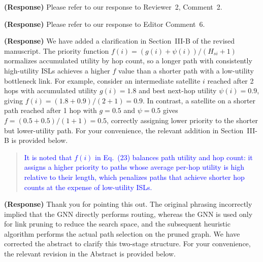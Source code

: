 \documentclass[letter]{article}
\begin{document}
\vspace{5mm}
{\bf (Response)}
Please refer to our response to Reviewer~2, Comment~2.

\vspace{10mm}
\noindent {}

\vspace{5mm}
{\bf (Response)}
Please refer to our response to Editor Comment~6.

\vspace{10mm}
\noindent {}

\vspace{5mm}
{\bf (Response)}
We have added a clarification in Section~III-B of the revised manuscript. The priority function $f(i) = (g(i) + \psi(i)) / (H_{si} + 1)$ normalizes accumulated utility by hop count, so a longer path with consistently high-utility ISLs achieves a higher $f$ value than a shorter path with a low-utility bottleneck link. For example, consider an intermediate satellite $i$ reached after 2 hops with accumulated utility $g(i) = 1.8$ and best next-hop utility $\psi(i) = 0.9$, giving $f(i) = (1.8 + 0.9)/(2+1) = 0.9$. In contrast, a satellite on a shorter path reached after 1 hop with $g = 0.5$ and $\psi = 0.5$ gives $f = (0.5+0.5)/(1+1) = 0.5$, correctly assigning lower priority to the shorter but lower-utility path. For your convenience, the relevant addition in Section~III-B is provided below.

\begin{quote}
\textcolor{blue}{It is noted that $f(i)$ in Eq.~(23) balances path utility and hop count: it assigns a higher priority to paths whose average per-hop utility is high relative to their length, which penalizes paths that achieve shorter hop counts at the expense of low-utility ISLs.}
\end{quote}

\vspace{10mm}
\noindent {}

\vspace{5mm}
{\bf (Response)}
Thank you for pointing this out. The original phrasing incorrectly implied that the GNN directly performs routing, whereas the GNN is used only for link pruning to reduce the search space, and the subsequent heuristic algorithm performs the actual path selection on the pruned graph. We have corrected the abstract to clarify this two-stage structure. For your convenience, the relevant revision in the Abstract is provided below.
\end{document}
